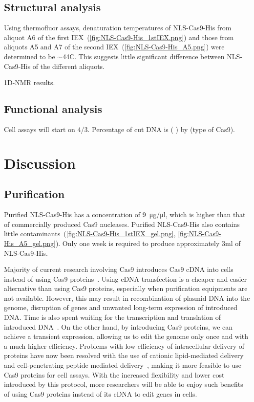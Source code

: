 \documentclass[11pt]{article}
\begin{document}
\subsection{Structural analysis}
Using thermofluor assays, denaturation temperatures of NLS-Cas9-His from aliquot A6 of the first IEX~(\autoref{fig:NLS-Cas9-His_1stIEX.png}) and those from aliquots A5 and A7 of the second IEX~(\autoref{fig:NLS-Cas9-His_A5.png}) were determined to be $\sim$44\degree C. This suggests little significant difference between NLS-Cas9-His of the different aliquots.

1D-NMR results.


\subsection{Functional analysis}
Cell assays will start on 4/3. Percentage of cut DNA is ( ) by (type of Cas9).


\newpage
\section{Discussion}

\subsection{Purification}
Purified NLS-Cas9-His has a concentration of \SI{9}{\micro\gram/\micro\litre}, which is higher than that of commercially produced Cas9 nucleases. Purified NLS-Cas9-His also contains little contaminants~(\autoref{fig:NLS-Cas9-His_1stIEX_gel.png}, \autoref{fig:NLS-Cas9-His_A5_gel.png}). Only one week is required to produce approximately 3ml of NLS-Cas9-His. 

Majority of current research involving Cas9 introduces Cas9 cDNA into cells instead of using Cas9 proteins~\citep{Kleber-Janke2000,Kleinstiver2015,Li2015}. Using cDNA transfection is a cheaper and easier alternative than using Cas9 proteins, especially when purification equipments are not available. However, this may result in recombination of plasmid DNA into the genome, disruption of genes and unwanted long-term expression of introduced DNA. Time is also spent waiting for the transcription and translation of introduced DNA~\citep{Ramakrishna2014}. On the other hand, by introducing Cas9 proteins, we can achieve a transient expression, allowing us to edit the genome only once and with a much higher efficiency. Problems with low efficiency of intracellular delivery of proteins have now been resolved with the use of cationic lipid-mediated delivery~\citep{Zuris2014} and cell-penetrating peptide mediated delivery~\citep{Ramakrishna2014}, making it more feasible to use Cas9 proteins for cell assays. With the increased flexibility and lower cost introduced by this protocol, more researchers will be able to enjoy such benefits of using Cas9 proteins instead of its cDNA to edit genes in cells.
\end{document}

